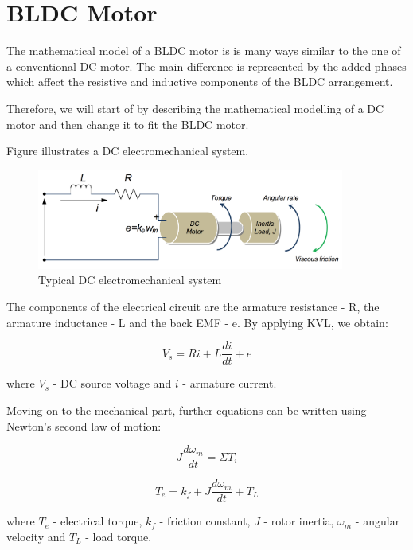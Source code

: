 
\section{BLDC Motor}
The mathematical model of a BLDC motor is is many ways similar to the one of a conventional DC motor. The main difference is represented by the added phases which affect the resistive and inductive components of the BLDC arrangement.

Therefore, we will start of by describing the mathematical modelling of a DC motor and then change it to fit the BLDC motor.

Figure \label{electromech} illustrates a DC electromechanical system.

\begin{figure}[H]
  \centering
    \includegraphics[width=0.9\textwidth]{images/electromech.png}
	\caption{Typical DC electromechanical system}
	\label{electromech}
\end{figure}

The components of the electrical circuit are the armature resistance - R, the armature inductance - L and the back EMF - e. By applying KVL, we obtain:

\begin{equation}
\label{1}
	V_{s}=Ri+L\frac{di}{dt}+e
\end{equation}

where $V_{s}$ - DC source voltage and $i$ - armature current.

Moving on to the mechanical part, further equations can be written using Newton's second law of motion:

\begin{equation}
\label{2}
	J\frac{d\omega_{m}}{dt}=\Sigma{T_{i}}
\end{equation}

\begin{equation}
\label{3}
	T_{e}=k_{f}+J\frac{d\omega_{m}}{dt}+T_{L}
\end{equation}

where $T_{e}$ - electrical torque, $k_{f}$ - friction constant, $J$ - rotor inertia, $\omega_{m}$ - angular velocity and $T_{L}$ - load torque.


